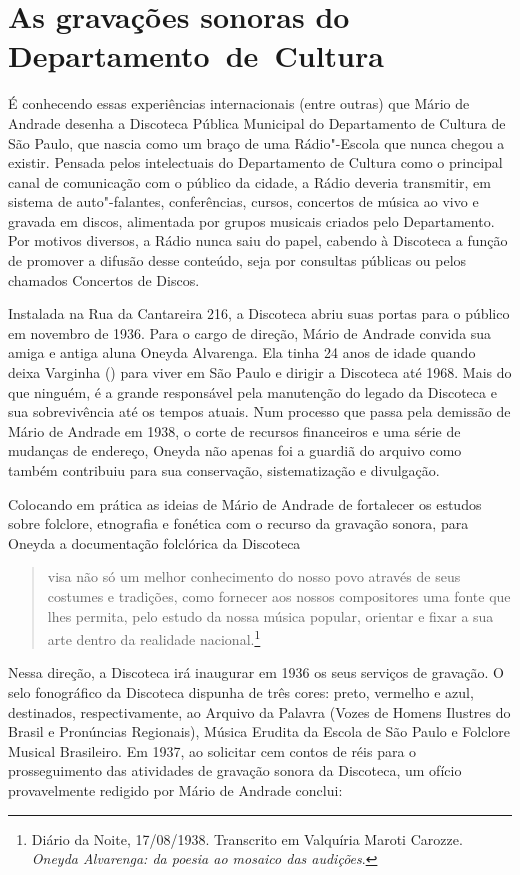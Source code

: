 \section{As gravações sonoras do Departamento~de~Cultura}

É conhecendo essas experiências internacionais (entre outras) que Mário
de Andrade desenha a Discoteca Pública Municipal do Departamento de
Cultura de São Paulo, que nascia como um braço de uma Rádio"-Escola que
nunca chegou a existir. Pensada pelos intelectuais do Departamento de
Cultura como o principal canal de comunicação com o público da cidade, a
Rádio deveria transmitir, em sistema de auto"-falantes, conferências,
cursos, concertos de música ao vivo e gravada em discos, alimentada por
grupos musicais criados pelo Departamento. Por motivos diversos, a Rádio
nunca saiu do papel, cabendo à Discoteca a função de promover a difusão
desse conteúdo, seja por consultas públicas ou pelos chamados Concertos
de Discos.

Instalada na Rua da Cantareira 216, a Discoteca abriu suas portas para o
público em novembro de 1936. Para o cargo de direção, Mário de Andrade
convida sua amiga e antiga aluna Oneyda Alvarenga. Ela tinha 24 anos de
idade quando deixa Varginha () para viver em São Paulo e dirigir a
Discoteca até 1968. Mais do que ninguém, é a grande responsável pela
manutenção do legado da Discoteca e sua sobrevivência até os tempos
atuais. Num processo que passa pela demissão de Mário de Andrade em
1938, o corte de recursos financeiros e uma série de mudanças de
endereço, Oneyda não apenas foi a guardiã do arquivo como também
contribuiu para sua conservação, sistematização e divulgação.

Colocando em prática as ideias de Mário de Andrade de fortalecer os
estudos sobre folclore, etnografia e fonética com o recurso da gravação
sonora, para Oneyda a documentação folclórica da Discoteca

\begin{quote}
visa não só um melhor conhecimento do nosso povo através de seus
costumes e tradições, como fornecer aos nossos compositores uma fonte
que lhes permita, pelo estudo da nossa música popular, orientar e fixar
a sua arte dentro da realidade nacional.\footnote{Diário da Noite,
  17/08/1938. Transcrito em Valquíria Maroti Carozze. \emph{Oneyda
  Alvarenga: da poesia ao mosaico das audições}.}
\end{quote}

Nessa direção, a Discoteca irá inaugurar em 1936 os seus serviços de
gravação. O selo fonográfico da Discoteca dispunha de três cores: preto,
vermelho e azul, destinados, respectivamente, ao Arquivo da Palavra
(Vozes de Homens Ilustres do Brasil e Pronúncias Regionais), Música
Erudita da Escola de São Paulo e Folclore Musical Brasileiro. Em 1937,
ao solicitar cem contos de réis para o prosseguimento das atividades de
gravação sonora da Discoteca, um ofício provavelmente redigido por Mário
de Andrade conclui:

